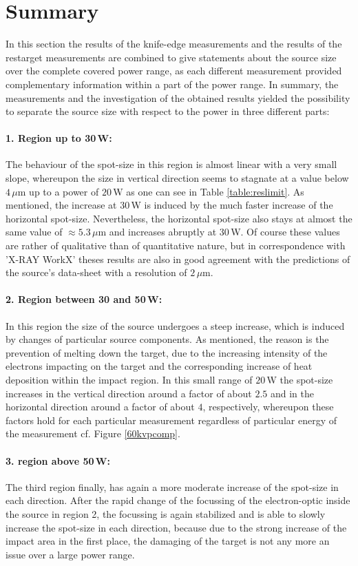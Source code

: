 \section{Summary}\label{sec:ssrsummary}
In this section the results of the knife-edge measurements and the results of the \gls{restarget} measurements are combined to give statements about the source size over the complete covered power range, as each different measurement provided complementary information within a part of the power range. In summary, the measurements and the investigation of the obtained results yielded the possibility to separate the source size with respect to the power in three different parts:
\paragraph{1. Region up to 30\,W:} The behaviour of the spot-size in this region is almost linear with a very small slope, whereupon the size in vertical direction seems to stagnate at a value below $4\, \mu$m up to a power of $20\,$W as one can see in Table \ref{table:reslimit}. As mentioned, the increase at $30\,$W is induced by the much faster increase of the horizontal spot-size. Nevertheless, the horizontal spot-size also stays at almost the same value of $\approx 5.3\, \mu$m and increases abruptly at $30\,$W. Of course these values are rather of qualitative than of quantitative nature, but in correspondence with 'X-RAY WorkX' theses results are also in good agreement with the predictions of the source's data-sheet \citep{DatasheetX} with a resolution of $2\, \mu$m.
\clearpage  
\paragraph{2. Region between 30 and 50\,W:} In this region the size of the source undergoes a steep increase, which is induced by changes of particular source components. As mentioned, the reason is the prevention of melting down the target, due to the increasing intensity of the electrons impacting on the target and the corresponding increase of heat deposition within the impact region. In this small range of $20\,$W the spot-size increases in the vertical direction around a factor of about $2.5$ and in the horizontal direction around a factor of about $4$, respectively, whereupon these factors hold for each particular measurement regardless of particular energy of the measurement cf. Figure \ref{60kvpcomp}.     
\paragraph{3. region above 50\,W:} The third region finally, has again a more moderate increase of the spot-size in each direction. After the rapid change of the focussing of the electron-optic inside the source in region 2, the focussing is again stabilized and is able to slowly increase the spot-size in each direction, because due to the strong increase of the impact area in the first place, the damaging of the target is not any more an issue over a large power range.\\  

